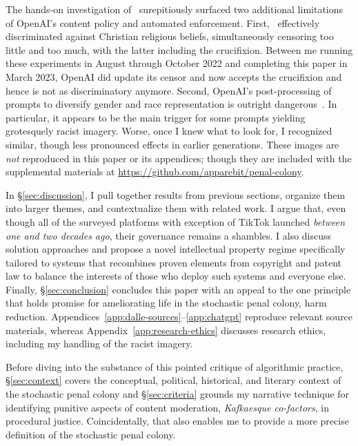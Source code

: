 The hands-on investigation of \DALLE\ surepitiously surfaced two additional
limitations of OpenAI's content policy and automated enforcement. First, \DALLE\
effectively discriminated against Christian religious beliefs, simultaneously
censoring too little and too much, with the latter including the crucifixion.
Between me running these experiments in August through October 2022 and
completing this paper in March 2023, OpenAI did update its censor and now
accepts the crucifixion and hence is not as discriminatory anymore. Second,
OpenAI's post-processing of prompts to diversify gender and race representation
is outright dangerous~\cite{OpenAI2022e,Sparkes2022}. In particular, it appears
to be the main trigger for some prompts yielding grotesquely racist imagery.
Worse, once I knew what to look for, I recognized similar, though less
pronounced effects in earlier generations. These images are \emph{not}
reproduced in this paper or its appendices; though they are included with the
supplemental materials at \url{https://github.com/apparebit/penal-colony}.

In \S\ref{sec:discussion}, I pull together results from previous sections,
organize them into larger themes, and contextualize them with related work. I
argue that, even though all of the surveyed platforms with exception of TikTok
launched \emph{between one and two decades ago}, their governance remains a
shambles. I also discuss solution approaches and propose a novel intellectual
property regime specifically tailored to \V{AI} systems that recombines proven
elements from copyright and patent law to balance the interests of those who
deploy such systems and everyone else. Finally, \S\ref{sec:conclusion} concludes
this paper with an appeal to the one principle that holds promise for
ameliorating life in the stochastic penal colony, harm reduction.
Appendices~\ref{app:dalle-sources}--\ref{app:chatgpt} reproduce relevant source
materials, whereas Appendix~\ref{app:research-ethics} discusses research ethics,
including my handling of the racist imagery.

Before diving into the substance of this pointed critique of algorithmic
practice, \S\ref{sec:context} covers the conceptual, political, historical, and
literary context of the stochastic penal colony and \S\ref{sec:criteria} grounds
my narrative technique for identifying punitive aspects of content moderation,
\emph{Kafkaesque co-factors}, in procedural justice. Coincidentally, that also
enables me to provide a more precise definition of the stochastic penal colony.


